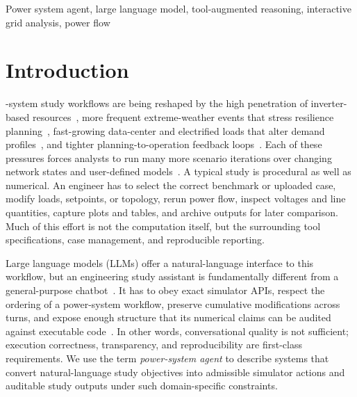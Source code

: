 \documentclass[journal]{IEEEtran}
\begin{document}
\begin{IEEEkeywords}
Power system agent, large language model, tool-augmented reasoning, interactive grid analysis, power flow
\end{IEEEkeywords}

\IEEEpeerreviewmaketitle



\section{Introduction}

-system study workflows are being reshaped by the
high penetration of inverter-based resources~\cite{she2023virtual}, more frequent extreme-weather events that
stress resilience planning~\cite{panteli2017power}, fast-growing
data-center and electrified loads that alter demand
profiles~\cite{masanet2020recalibrating}, and tighter
planning-to-operation feedback loops~\cite{kroposki2017achieving}.
Each of these pressures forces analysts to run many more scenario
iterations over changing network states and user-defined models~\cite{she2026hybrid}.
A typical study is procedural as well as numerical. 
An engineer has to select the correct benchmark or uploaded case, modify loads, setpoints, or topology, rerun power flow, inspect voltages and line quantities,
capture plots and tables, and archive outputs for later comparison.
Much of this effort is not the computation itself, but the surrounding tool specifications, case management, and reproducible reporting.


Large language models (LLMs) offer a natural-language interface to this workflow, but an engineering study assistant is fundamentally different from a general-purpose chatbot~\cite{cheng2025leveraging, zhao2026large}.
It has to obey exact simulator APIs, respect the ordering of a power-system workflow, preserve cumulative modifications across turns, and expose enough structure that its numerical claims can be audited against executable code~\cite{jin2025gridmind}.
In other words, conversational quality is not sufficient; execution correctness, transparency, and reproducibility are first-class requirements.
We use the term \emph{power-system agent} to describe systems that convert natural-language study objectives into admissible simulator actions and auditable study outputs under such domain-specific constraints.
\end{document}
